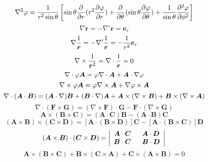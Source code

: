 \documentclass[UTF8,9pt]{ctexart}
\begin{document}
$$\nabla^2\varphi=\ff{r^2\sin\t}\left[\sin\t\pp{}{r}(r^2\pp{\varphi}{r})+\pp{}{\t}(\sin\t\pp{\varphi}{\t})+\ff{\sin\t}\pp[2]{\varphi}{\phi}\right]$$
$$\nabla\bm{r}=-\nabla'\bm{r}=\bm{e}_r$$
$$\nabla\ff{\bm{r}}=-\nabla'\ff{\bm{r}}=-\ff{r^2}\bm{e}_r$$
$$\curl\ff{\bm{r}^2}=\div\ff{\bm{r}}=0$$
$$\div\vp\bm{A}=\vp\div\bm{A}+\bm{A}\cdot\grad\vp$$
$$\curl\vp\bm{A}=\vp\curl\bm{A}+\grad\vp\times\bm{A}$$
$$\div(\bm{A}\cdot\bm{B}) = (\bm{A}\cdot\nabla)\bm{B}+(\bm{B}\cdot\nabla)\bm{A}+\bm{A}\tm(\curl\bm{B})+\bm{B}\tm(\curl\bm{A})$$
$$\nabla\cdot(\bm{F} \times \bm{G})=(\nabla\times \bm{F})\cdot \bm{G}-\bm{F}\cdot(\nabla\times \bm{G})$$
$$\bm{A}\times(\bm{B}\times\bm{C})=(\bm{A}\cdot\bm{C})\bm{B}-(\bm{A}\cdot\bm{B})\bm{C}$$
$$( \bm{ A } \times \bm{ B } ) \times ( \bm{ C } \times \bm{ D } ) = [ \bm{ A } \cdot ( \bm{ B } \times \bm{ D } ) ] \bm{ C } - [ \bm{ A } \cdot ( \bm{ B } \times \bm{ C } ) ] \bm{ D }$$
$$( \bm{ A } \times \bm{ B } ) \cdot ( \bm{ C } \times \bm{ D } ) = \abs{\ar{\bm{A}\cdot\bm{C}&\ \ \bm{A}\cdot\bm{D}\\
\bm{B}\cdot\bm{C}&\ \ \bm{B}\cdot\bm{D}}}$$
$$\bm{ A } \times ( \bm{ B } \times \bm{ C } ) + \bm{ B } \times ( \bm{ C } \times \bm{ A } ) + \bm{ C } \times ( \bm{ A } \times \bm{ B } ) = 0$$
\end{document}
